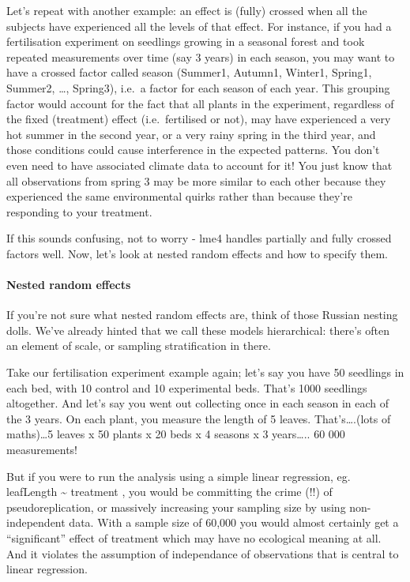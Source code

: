 \documentclass[
]{article}
\begin{document}
Let's repeat with another example: an effect is (fully) crossed when all
the subjects have experienced all the levels of that effect. For
instance, if you had a fertilisation experiment on seedlings growing in
a seasonal forest and took repeated measurements over time (say 3 years)
in each season, you may want to have a crossed factor called season
(Summer1, Autumn1, Winter1, Spring1, Summer2, \ldots, Spring3), i.e.~a
factor for each season of each year. This grouping factor would account
for the fact that all plants in the experiment, regardless of the fixed
(treatment) effect (i.e.~fertilised or not), may have experienced a very
hot summer in the second year, or a very rainy spring in the third year,
and those conditions could cause interference in the expected patterns.
You don't even need to have associated climate data to account for it!
You just know that all observations from spring 3 may be more similar to
each other because they experienced the same environmental quirks rather
than because they're responding to your treatment.

If this sounds confusing, not to worry - lme4 handles partially and
fully crossed factors well. Now, let's look at nested random effects and
how to specify them.

\paragraph{Nested random effects}\label{nested-random-effects}

If you're not sure what nested random effects are, think of those
Russian nesting dolls. We've already hinted that we call these models
hierarchical: there's often an element of scale, or sampling
stratification in there.

Take our fertilisation experiment example again; let's say you have 50
seedlings in each bed, with 10 control and 10 experimental beds. That's
1000 seedlings altogether. And let's say you went out collecting once in
each season in each of the 3 years. On each plant, you measure the
length of 5 leaves. That's\ldots.(lots of maths)\ldots5 leaves x 50
plants x 20 beds x 4 seasons x 3 years\ldots.. 60 000 measurements!

But if you were to run the analysis using a simple linear regression,
eg. leafLength \textasciitilde{} treatment , you would be committing the
crime (!!) of pseudoreplication, or massively increasing your sampling
size by using non-independent data. With a sample size of 60,000 you
would almost certainly get a ``significant'' effect of treatment which
may have no ecological meaning at all. And it violates the assumption of
independance of observations that is central to linear regression.
\end{document}
